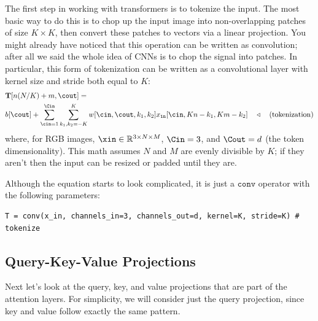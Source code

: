 The first step in working with transformers is to tokenize the input. The most basic way to do this is to chop up the input image into non-overlapping patches of size $K \times K$, then convert these patches to vectors via a linear projection. You might already have noticed that this operation can be written as convolution; after all we said the whole idea of CNNs is to chop the signal into patches. In particular, this form of tokenization can be written as a convolutional layer with kernel size and stride both equal to $K$:
\begin{align}
&\mathbf{T}[n(N/K)+m,\cout] = \nonumber\\
&b[\cout] +  \sum_{\cin=1}^{\Cin} \sum_{k_1,k_2=-K}^K w[\cin,\cout,k_1,k_2] x_{\texttt{in}}[\cin,K n-k_1,K m-k_2] \quad \triangleleft \quad \text{(tokenization)} \label{eqn:transformers:tokenization_as_conv}
\end{align}
where, for RGB images, $\xin \in \mathbb{R}^{3 \times N \times M}$, $\Cin=3$, and $\Cout=d$ (the token dimensionality). This math assumes $N$ and $M$ are evenly divisible by $K$; if they aren't then the input can be resized or padded until they are.

Although the equation starts to look complicated, it is just a $\texttt{conv}$ operator with the following parameters:
\begin{verbatim}
T = conv(x_in, channels_in=3, channels_out=d, kernel=K, stride=K) # tokenize
\end{verbatim}

\subsection{Query-Key-Value Projections}

Next let's look at the query, key, and value projections that are part of the attention layers. For simplicity, we will consider just the query projection, since key and value follow exactly the same pattern.

